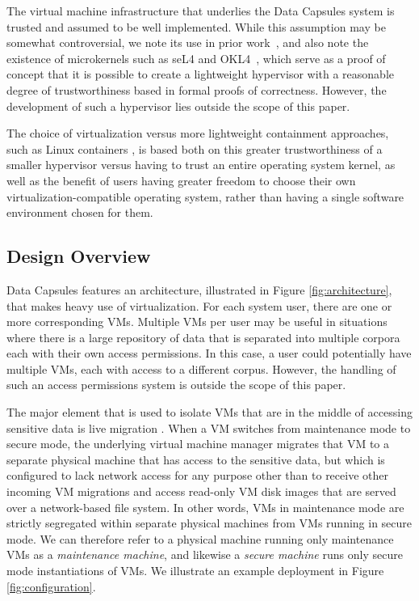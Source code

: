 \documentclass{acm_proc_article-sp}
\begin{document}
The virtual machine infrastructure that underlies the Data Capsules system is
trusted and assumed to be well implemented.  While this assumption may be
somewhat controversial, we note its use in prior work~\cite{capsules-borders},
and also note the existence of microkernels such as seL4 and OKL4~\cite{sel4,
sel4-secure, OKL4}, which serve as a proof of concept that it is possible to
create a lightweight hypervisor with a reasonable degree of trustworthiness
based in formal proofs of correctness.  However, the development of such a
hypervisor lies outside the scope of this paper.

The choice of virtualization versus more lightweight containment approaches,
such as Linux containers \cite{lxc}, is based both on this greater
trustworthiness of a smaller hypervisor versus having to trust an entire
operating system kernel, as well as the benefit of users having greater freedom
to choose their own virtualization-compatible operating system, rather than
having a single software environment chosen for them.

\subsection{Design Overview}

Data Capsules features an architecture, illustrated in Figure
\ref{fig:architecture}, that makes heavy use of virtualization.  For each
system user, there are one or more corresponding VMs.  Multiple VMs per user
may be useful in situations where there is a large repository of data that is
separated into multiple corpora each with their own access permissions.  In
this case, a user could potentially have multiple VMs, each with access to a
different corpus.  However, the handling of such an access permissions system
is outside the scope of this paper.

The major element that is used to isolate VMs that are in the middle of
accessing sensitive data is live migration \cite{migration-clark}.  When a VM
switches from maintenance mode to secure mode, the underlying virtual machine
manager migrates that VM to a separate physical machine that has access to the
sensitive data, but which is configured to lack network access for any purpose
other than to receive other incoming VM migrations and access read-only VM disk
images that are served over a network-based file system.  In other words, VMs
in maintenance mode are strictly segregated within separate physical machines
from VMs running in secure mode.  We can therefore refer to a physical machine
running only maintenance VMs as a \emph{maintenance machine}, and likewise a
\emph{secure machine} runs only secure mode instantiations of VMs.  We
illustrate an example deployment in Figure \ref{fig:configuration}.
\end{document}
